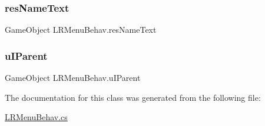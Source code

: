 \mbox{\label{class_l_r_menu_behav_a99dafb63ae87a4b82fb89b681605849c}} 
\subsubsection{\texorpdfstring{res\+Name\+Text}{resNameText}}
{\footnotesize\ttfamily Game\+Object L\+R\+Menu\+Behav.\+res\+Name\+Text}

\mbox{\label{class_l_r_menu_behav_a8885c84d3b95c8275b8316b1268172a2}} 
\subsubsection{\texorpdfstring{u\+I\+Parent}{uIParent}}
{\footnotesize\ttfamily Game\+Object L\+R\+Menu\+Behav.\+u\+I\+Parent}



The documentation for this class was generated from the following file\+:\begin{DoxyCompactItemize}
\item 
\mbox{\hyperlink{_l_r_menu_behav_8cs}{L\+R\+Menu\+Behav.\+cs}}\end{DoxyCompactItemize}
